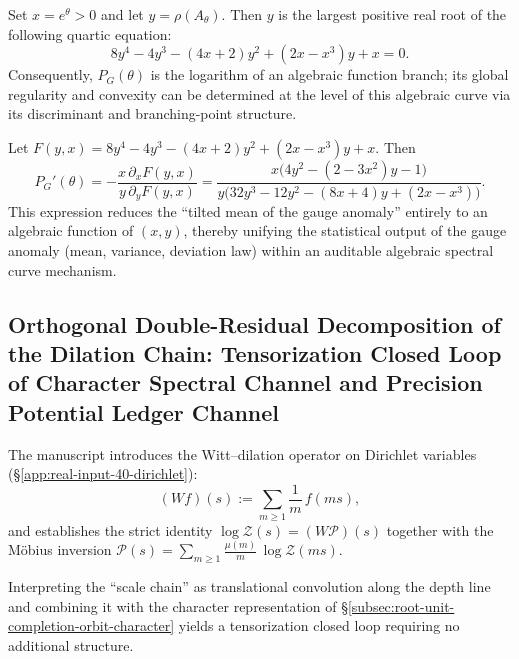 \begin{theorem}\label{thm:gauge-pressure-quartic}
Set \(x=e^\theta>0\) and let \(y=\rho(A_\theta)\). Then \(y\) is the largest positive real root of the following quartic equation:
\begin{equation}\label{eq:gauge-pressure-quartic}
8y^4-4y^3-(4x+2)y^2+(2x-x^3)y+x=0.
\end{equation}
Consequently, \(P_G(\theta)\) is the logarithm of an algebraic function branch; its global regularity and convexity can be determined at the level of this algebraic curve via its discriminant and branching-point structure.
\end{theorem}

\begin{corollary}\label{cor:gauge-pressure-tilt-derivative}
Let \(F(y,x)=8y^4-4y^3-(4x+2)y^2+(2x-x^3)y+x\). Then
\begin{equation}\label{eq:gauge-pressure-P-prime}
P_G'(\theta)=-\frac{x\,\partial_x F(y,x)}{y\,\partial_y F(y,x)}
=\frac{x\bigl(4y^2-(2-3x^2)y-1\bigr)}{y\bigl(32y^3-12y^2-(8x+4)y+(2x-x^3)\bigr)}.
\end{equation}
This expression reduces the ``tilted mean of the gauge anomaly'' entirely to an algebraic function of \((x,y)\), thereby unifying the statistical output of the gauge anomaly (mean, variance, deviation law) within an auditable algebraic spectral curve mechanism.
\end{corollary}

\subsection{Orthogonal Double-Residual Decomposition of the Dilation Chain: Tensorization Closed Loop of Character Spectral Channel and Precision Potential Ledger Channel}\label{subsec:dilation-character-precision-tensor}

The manuscript introduces the Witt--dilation operator on Dirichlet variables (\S\ref{app:real-input-40-dirichlet}):
\[
(Wf)(s):=\sum_{m\ge 1}\frac{1}{m}\,f(ms),
\]
and establishes the strict identity \(\log\mathcal{Z}(s)=(W\mathcal{P})(s)\) together with the M\"obius inversion
\(\mathcal{P}(s)=\sum_{m\ge 1}\frac{\mu(m)}{m}\,\log\mathcal{Z}(ms)\).

Interpreting the ``scale chain'' as translational convolution along the depth line and combining it with the character representation of \S\ref{subsec:root-unit-completion-orbit-character} yields a tensorization closed loop requiring no additional structure.

